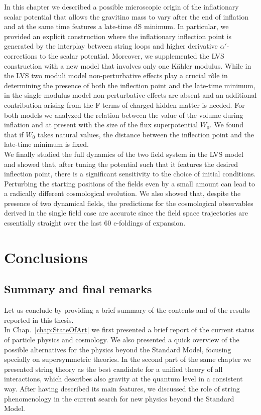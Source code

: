 \documentclass[12pt,a4paper]{book}
\begin{document}
In this chapter we described a possible microscopic origin of the inflationary scalar potential that allows the gravitino mass to vary after the end of inflation and at the same time features a late-time dS minimum. In particular, we provided an explicit construction where the inflationary inflection point is generated by the interplay between string loops and higher derivative $\alpha'$-corrections to the scalar potential. Moreover, we supplemented the LVS construction with a new model that involves only one K\"ahler modulus. While in the LVS two moduli model non-perturbative effects play a crucial r\^ole in determining the presence of both the inflection point and the late-time minimum, in the single modulus model non-perturbative effects are absent and an additional contribution arising from the F-terms of charged hidden matter is needed. For both models we analyzed the relation between the value of the volume during inflation and at present with the size of the flux superpotential $W_0$. We found that if $W_0$ takes natural values, the distance between the inflection point and the late-time minimum is fixed.\\

We finally studied the full dynamics of the two field system in the LVS model and showed that, after tuning the potential such that it features the desired inflection point, there is a significant sensitivity to the choice of initial conditions. Perturbing the starting positions of the fields even by a small amount can lead to a radically different cosmological evolution. We also showed that, despite the presence of two dynamical fields, the predictions for the cosmological observables derived in the single field case are accurate since the field space trajectories are essentially straight over the last $60$ e-foldings of expansion.

\part{Conclusions}

\chapter{Summary and final remarks}

Let us conclude by providing a brief summary of the contents and of the results reported in this thesis.\\

In Chap.~\ref{chap:StateOfArt} we first presented a brief report of the current status of particle physics and cosmology. We also presented a quick overview of the possible alternatives for the physics beyond the Standard Model, focusing specially on supersymmetric theories. In the second part of the same chapter we presented string theory as the best candidate for a unified theory of all interactions, which describes also gravity at the quantum level in a consistent way. After having described its main features, we discussed the role of string phenomenology in the current search for new physics beyond the Standard Model.\\
\end{document}
